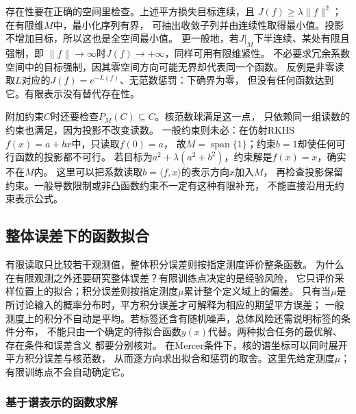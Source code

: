存在性要在正确的空间里检查。上述平方损失目标连续，且
$J(f)\geq\lambda\lVert f\rVert^2$；在有限维$M$中，最小化序列有界，
可抽出收敛子列并由连续性取得最小值。投影不增加目标，所以这也是全空间最小值。
更一般地，若$J|_M$下半连续、某处有限且强制，即
$\lVert f\rVert\to\infty$时$J(f)\to+\infty$，同样可用有限维紧性。
不必要求冗余系数空间中的目标强制，因其零空间方向可能无界却代表同一个函数。
反例是非零读取$L$对应的$J(f)=e^{-L(f)}$、无范数惩罚：下确界为零，
但没有任何函数达到它。有限表示没有替代存在性。

附加约束$C$时还要检查$P_M(C)\subseteq C$。核范数球满足这一点，
只依赖同一组读数的约束也满足，因为投影不改变读数。
一般约束则未必：在仿射RKHS$f(x)=a+bx$中，只读取$f(0)=a$，
故$M=\operatorname{span}\{1\}$；约束$b=1$却使任何可行函数的投影都不可行。
若目标为$a^2+\lambda(a^2+b^2)$，约束解是$f(x)=x$，确实不在$M$内。
这里可以把系数读取$b=\langle f,x\rangle$的表示方向$x$加入$M$，
再检查投影保留约束。一般导数限制或非凸函数约束不一定有这种有限补充，
不能直接沿用无约束表示公式。

\subsection{整体误差下的函数拟合}
\label{sec:functional-integral-error-fitting}

有限读取只比较若干观测值，整体积分误差则按指定测度评价整条函数。
为什么在有限观测之外还要研究整体误差？有限训练点决定的是经验风险，
它只评价采样位置上的拟合；积分误差则按指定测度$\mu$累计整个定义域上的偏差。
只有当$\mu$是所讨论输入的概率分布时，平方积分误差才可解释为相应的期望平方误差；
一般测度上的积分不自动是平均。若标签还含有随机噪声，总体风险还需说明标签的条件分布，
不能只由一个确定的待拟合函数$y(x)$代替。两种拟合任务的最优解、存在条件和误差含义
都要分别核对。
在Mercer条件下，核的谱坐标可以同时展开平方积分误差与核范数，
从而逐方向求出拟合和惩罚的取舍。这里先给定测度$\mu$；有限训练点不会自动确定它。

\subsubsection{基于谱表示的函数求解}
\label{sec:functional-spectral-fitting-solvers}

